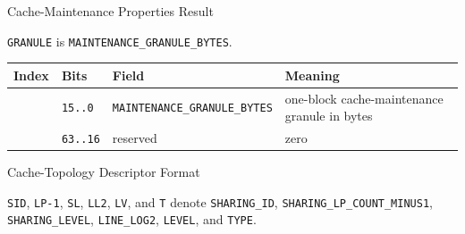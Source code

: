 \begin{manuallistedformatdiagram}{Cache-Maintenance Properties Result}
\end{manuallistedformatdiagram}
{\small\texttt{GRANULE} is \texttt{MAINTENANCE\_GRANULE\_BYTES}.\par}

\Needspace{1.25in}
\begingroup\footnotesize
\setlength{\aboverulesep}{0pt}
\setlength{\belowrulesep}{0pt}
\setlength{\extrarowheight}{1.2pt}
\begin{center}
\begin{tabularx}{\linewidth}{@{}>{\raggedright\arraybackslash}p{0.45in}>{\raggedright\arraybackslash}p{0.65in}>{\raggedright\arraybackslash}p{2.20in}>{\raggedright\arraybackslash}X@{}}
\toprule
\rowcolor{ManualHeaderFill}
\textbf{Index} & \textbf{Bits} & \textbf{Field} & \textbf{Meaning}\\
\midrule
1 & \texttt{15..0} & \texttt{MAINTENANCE\_GRANULE\_BYTES} & one-block cache-maintenance granule in bytes\\
1 & \texttt{63..16} & reserved & zero\\
\bottomrule
\end{tabularx}
\end{center}
\endgroup


\begin{manuallistedformatdiagram}{Cache-Topology Descriptor Format}
\end{manuallistedformatdiagram}
{\small\texttt{SID}, \texttt{LP-1}, \texttt{SL}, \texttt{LL2}, \texttt{LV}, and \texttt{T} denote \texttt{SHARING\_ID}, \texttt{SHARING\_LP\_COUNT\_MINUS1}, \texttt{SHARING\_LEVEL}, \texttt{LINE\_LOG2}, \texttt{LEVEL}, and \texttt{TYPE}.\par}

